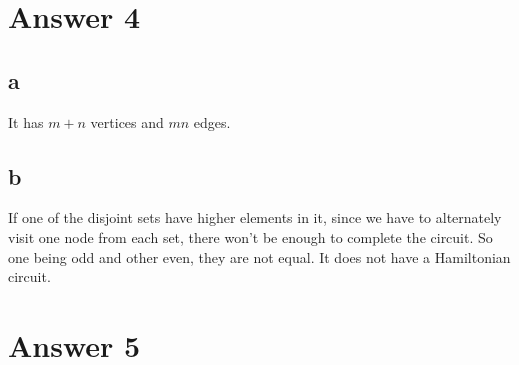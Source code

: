 \documentclass[11pt]{article}
\begin{document}
\section*{Answer 4}
\subsection*{a}
It has $m+n$ vertices and $mn$ edges.
\subsection*{b}
If one of the disjoint sets have higher elements in it, since we have to alternately visit one node from each set, there won't be enough to complete the circuit. So one being odd and other even, they are not equal. It does not have a Hamiltonian circuit.

\newpage

\newcommand\encircle[1]{%
  \tikz[baseline=(X.base)] 
    \node (X) [draw, shape=circle, inner sep=0] {\strut #1};}

\section*{Answer 5}
\end{document}
